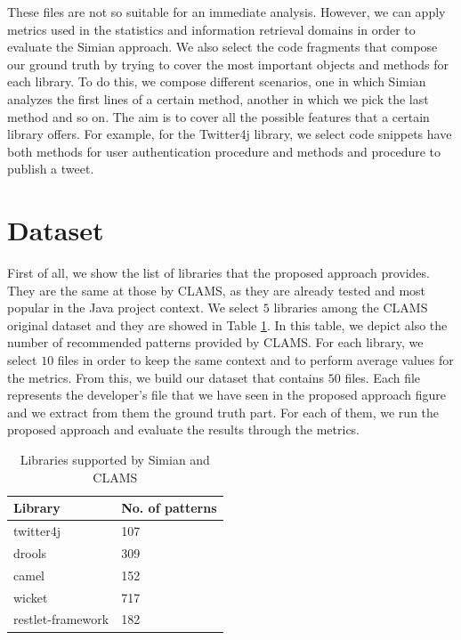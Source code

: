 These files are not so suitable for an immediate analysis. However, we can apply metrics used in the statistics and information retrieval domains in order to evaluate the Simian approach. We also select the code fragments that compose our ground truth by trying to cover the most important objects and methods for each library. To do this, we compose different scenarios, one in which Simian analyzes the first lines of a certain method, another in which we pick the last method and so on. The aim is to cover all the possible features that a certain library offers. For example, for the Twitter4j library, we select code snippets have both methods for user authentication procedure and methods and procedure to publish a tweet.


\section{Dataset}

First of all, we show the list of libraries that the proposed approach provides. They are the same at those by CLAMS, as they are already tested and most popular in the Java project context. We select $5$ libraries among the CLAMS original dataset and they are showed in Table \ref{Table:7}. In this table, we depict also the number of recommended patterns provided by CLAMS. For each library, we select $10$ files in order to keep the same context and to perform average values for the metrics. From this, we build our dataset that contains $50$ files. Each file represents the developer's file that we have seen in the proposed approach figure and we extract from them the ground truth part. For each of them, we run the proposed approach and evaluate the results through the metrics.


\begin{table}[!h]
	\centering
	\begin{tabular}{|p{3.5cm}|p{3.5cm}|}\hline
	 \textbf{Library} & \textbf{No. of patterns}  \\\hline
	 twitter4j &  107   \\\hline
	drools & 309 \\\hline
	camel & 152  \\\hline 
	wicket & 717  \\\hline
	restlet-framework & 182  \\\hline
	\end{tabular}
	\caption{Libraries supported by Simian and CLAMS }\label{Table:7}
\end{table} 



